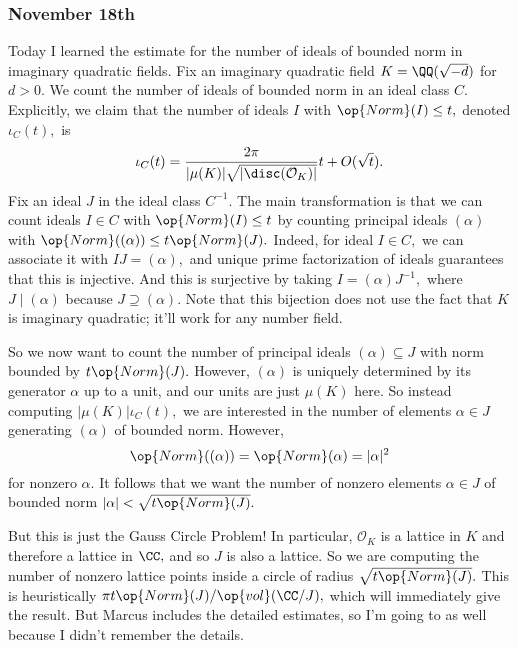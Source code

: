 \subsubsection{November 18th}
Today I learned the estimate for the number of ideals of bounded norm in imaginary quadratic fields. Fix an imaginary quadratic field $K=\QQ(\sqrt{-d})$ for $d>0.$ We count the number of ideals of bounded norm in an ideal class $C.$ Explicitly, we claim that the number of ideals $I$ with $\op{Norm}(I)\le t,$ denoted $\iota_C(t),$ is
\[\iota_C(t)=\frac{2\pi}{|\mu(K)|\sqrt{|\disc(\mathcal O_K)|}}t+O(\sqrt t).\]
Fix an ideal $J$ in the ideal class $C^{-1}.$ The main transformation is that we can count ideals $I\in C$ with $\op{Norm}(I)\le t$ by counting principal ideals $(\alpha)$ with $\op{Norm}((\alpha))\le t\op{Norm}(J).$ Indeed, for ideal $I\in C,$ we can associate it with $IJ=(\alpha),$ and unique prime factorization of ideals guarantees that this is injective. And this is surjective by taking $I=(\alpha)J^{-1},$ where $J\mid(\alpha)$ because $J\supseteq(\alpha).$ Note that this bijection does not use the fact that $K$ is imaginary quadratic; it'll work for any number field.

So we now want to count the number of principal ideals $(\alpha)\subseteq J$ with norm bounded by $t\op{Norm}(J).$ However, $(\alpha)$ is uniquely determined by its generator $\alpha$ up to a unit, and our units are just $\mu(K)$ here. So instead computing $|\mu(K)|\iota_C(t),$ we are interested in the number of elements $\alpha\in J$ generating $(\alpha)$ of bounded norm. However,
\[\op{Norm}((\alpha))=\op{Norm}(\alpha)=|\alpha|^2\]
for nonzero $\alpha.$ It follows that we want the number of nonzero elements $\alpha\in J$ of bounded norm $|\alpha|<\sqrt{t\op{Norm}(J)}.$

But this is just the Gauss Circle Problem! In particular, $\mathcal O_K$ is a lattice in $K$ and therefore a lattice in $\CC,$ and so $J$ is also a lattice. So we are computing the number of nonzero lattice points inside a circle of radius $\sqrt{t\op{Norm}(J)}.$ This is heuristically $\pi t\op{Norm}(J)/\op{vol}(\CC/J),$ which will immediately give the result. But Marcus includes the detailed estimates, so I'm going to as well because I didn't remember the details.


